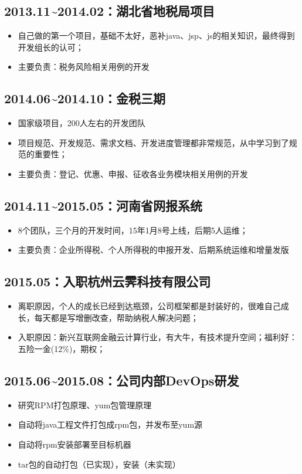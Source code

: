 \documentclass[11pt]{article}
\begin{document}
\subsection*{2013.11\textasciitilde{}2014.02：湖北省地税局项目}
\label{sec:orgheadline4}
\begin{itemize}
\item 自己做的第一个项目，基础不太好，恶补java、jsp、js的相关知识，最终得到开发组长的认可；
\item 主要负责：税务风险相关用例的开发
\end{itemize}
\subsection*{2014.06\textasciitilde{}2014.10：金税三期}
\label{sec:orgheadline5}
\begin{itemize}
\item 国家级项目，200人左右的开发团队
\item 项目规范、开发规范、需求文档、开发进度管理都非常规范，从中学习到了规范的重要性；
\item 主要负责：登记、优惠、申报、征收各业务模块相关用例的开发
\end{itemize}
\subsection*{2014.11\textasciitilde{}2015.05：河南省网报系统}
\label{sec:orgheadline6}
\begin{itemize}
\item 8个团队，三个月的开发时间，15年1月8号上线，后期5人运维；
\item 主要负责：企业所得税、个人所得税的申报开发、后期系统运维和增量发版
\end{itemize}
\subsection*{2015.05：入职杭州云霁科技有限公司}
\label{sec:orgheadline7}
\begin{itemize}
\item 离职原因，个人的成长已经到达瓶颈，公司框架都是封装好的，很难自己成长，每天都是写增删改查，帮助纳税人解决问题；
\item 入职原因：新兴互联网金融云计算行业，有大牛，有技术提升空间；福利好：五险一金(12\%)，期权；
\end{itemize}
\subsection*{2015.06\textasciitilde{}2015.08：公司内部DevOps研发}
\label{sec:orgheadline8}
\begin{itemize}
\item 研究RPM打包原理、yum包管理原理
\item 自动将java工程文件打包成rpm包，并发布至yum源
\item 自动将rpm安装部署至目标机器
\item tar包的自动打包（已实现），安装（未实现）
\end{itemize}
\end{document}
